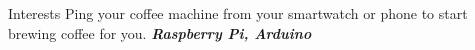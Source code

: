 \begin{cvskills}
  \cvskill
    {Interests}
    {
	Ping your coffee machine from your smartwatch or phone to start brewing coffee for you.  \textit{\textbf{Raspberry Pi, Arduino}}
    }
\end{cvskills}
